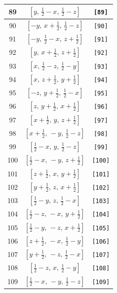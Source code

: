 \documentclass[fleqn,8pt]{jsarticle}
\begin{document}
\begin{longtable}{ccc}
89 & $\left[ y,\, \frac{1}{2} - x,\, \frac{1}{2} - z \right]$ & {\tt [89]} \\ \hline
90 & $\left[ - y,\, x + \frac{1}{2},\, \frac{1}{2} - z \right]$ & {\tt [90]} \\ \hline
91 & $\left[ - y,\, \frac{1}{2} - x,\, z + \frac{1}{2} \right]$ & {\tt [91]} \\ \hline
92 & $\left[ y,\, x + \frac{1}{2},\, z + \frac{1}{2} \right]$ & {\tt [92]} \\ \hline
93 & $\left[ x,\, \frac{1}{2} - z,\, \frac{1}{2} - y \right]$ & {\tt [93]} \\ \hline
94 & $\left[ x,\, z + \frac{1}{2},\, y + \frac{1}{2} \right]$ & {\tt [94]} \\ \hline
95 & $\left[ - z,\, y + \frac{1}{2},\, \frac{1}{2} - x \right]$ & {\tt [95]} \\ \hline
96 & $\left[ z,\, y + \frac{1}{2},\, x + \frac{1}{2} \right]$ & {\tt [96]} \\ \hline
97 & $\left[ x + \frac{1}{2},\, y,\, z + \frac{1}{2} \right]$ & {\tt [97]} \\ \hline
98 & $\left[ x + \frac{1}{2},\, - y,\, \frac{1}{2} - z \right]$ & {\tt [98]} \\ \hline
99 & $\left[ \frac{1}{2} - x,\, y,\, \frac{1}{2} - z \right]$ & {\tt [99]} \\ \hline
100 & $\left[ \frac{1}{2} - x,\, - y,\, z + \frac{1}{2} \right]$ & {\tt [100]} \\ \hline
101 & $\left[ z + \frac{1}{2},\, x,\, y + \frac{1}{2} \right]$ & {\tt [101]} \\ \hline
102 & $\left[ y + \frac{1}{2},\, z,\, x + \frac{1}{2} \right]$ & {\tt [102]} \\ \hline
103 & $\left[ \frac{1}{2} - y,\, z,\, \frac{1}{2} - x \right]$ & {\tt [103]} \\ \hline
104 & $\left[ \frac{1}{2} - z,\, - x,\, y + \frac{1}{2} \right]$ & {\tt [104]} \\ \hline
105 & $\left[ \frac{1}{2} - y,\, - z,\, x + \frac{1}{2} \right]$ & {\tt [105]} \\ \hline
106 & $\left[ z + \frac{1}{2},\, - x,\, \frac{1}{2} - y \right]$ & {\tt [106]} \\ \hline
107 & $\left[ y + \frac{1}{2},\, - z,\, \frac{1}{2} - x \right]$ & {\tt [107]} \\ \hline
108 & $\left[ \frac{1}{2} - z,\, x,\, \frac{1}{2} - y \right]$ & {\tt [108]} \\ \hline
109 & $\left[ \frac{1}{2} - x,\, - y,\, \frac{1}{2} - z \right]$ & {\tt [109]} \\ \hline

\end{longtable}
\end{document}
